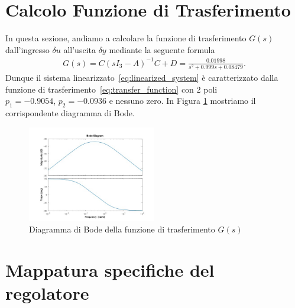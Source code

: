 \documentclass[a4paper, 11pt]{article}
\begin{document}
\section{Calcolo Funzione di Trasferimento}

In questa sezione, andiamo a calcolare la funzione di trasferimento $G(s)$ dall'ingresso $\delta u$ all'uscita $\delta y$ mediante la seguente formula 
%
%
\begin{align}\label{eq:transfer_function}
G(s) = C(sI_3 - A)^{-1}C +D = \frac{0.01998}{s^2 + 0.999 s + 0.08479}.
\end{align}
%
Dunque il sistema linearizzato~\eqref{eq:linearized_system} è caratterizzato dalla funzione di trasferimento~\eqref{eq:transfer_function} con 2 poli \\ $p_1 = -0.9054$, $p_2 = -0.0936$ e nessuno zero. In Figura \ref{fig:bode1} mostriamo il corrispondente diagramma di Bode. 

\begin{figure}[h]
\centering
\includegraphics[width=0.5\textwidth]{fig_bode_G(s).jpg}
\caption{Diagramma di Bode della funzione di trasferimento $G(s)$}
\label{fig:bode1}
\end{figure}

\section{Mappatura specifiche del regolatore}
\label{sec:specifications}
\end{document}
